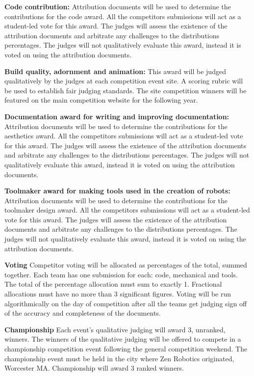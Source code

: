 \documentclass{article}
\begin{document}
\textbf{Code contribution:} Attribution documents will be used to determine the contributions for the code award. All the competitors submissions will act as a student-led vote for this award. The judges will assess the existence of the  attribution documents and arbitrate any challenges to the distributions percentages. The judges will not qualitatively evaluate this award, instead it is voted on using the attribution documents. 
 	
\textbf{Build quality, adornment and animation:} This award will be judged qualitatively by the judges at each competition event site. A scoring rubric will be used to establish fair judging standards. The site competition winners will be featured on the main competition website for the following year. 
 	
\textbf{Documentation award for writing and improving documentation:} Attribution documents will be used to determine the contributions for the aesthetics award. All the competitors submissions will act as a student-led vote for this award. The judges will assess the existence of the  attribution documents and arbitrate any challenges to the distributions percentages. The judges will not qualitatively evaluate this award, instead it is voted on using the attribution documents. 
 	
\textbf{Toolmaker award for making tools used in the creation of robots:} Attribution documents will be used to determine the contributions for the toolmaker design award. All the competitors submissions will act as a student-led vote for this award. The judges will assess the existence of the  attribution documents and arbitrate any challenges to the distributions percentages. The judges will not qualitatively evaluate this award, instead it is voted on using the attribution documents. 

\textbf{Voting} Competitor voting will be allocated as percentages of the total, summed together. Each team has one submission for each: code, mechanical and tools. The total of the percentage allocation must sum to exactly 1. Fractional allocations must have no more than 3 significant figures. Voting will be run algorithmically on the day of competition after all the teams get judging sign off of the accuracy and completeness of the documents. 

 	
\textbf{Championship} Each event's qualitative judging will award 3, unranked, winners. The winners of the qualitative judging will be offered to compete in a championship competition event following the general competition weekend. The championship event must be held in the city where Zen Robotics originated, Worcester MA. Championship will award 3 ranked winners. 
\end{document}
